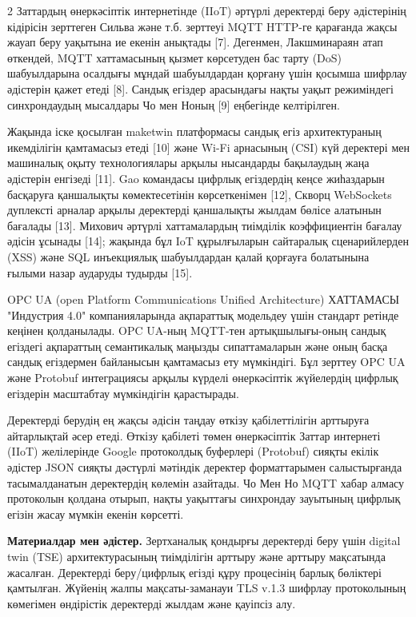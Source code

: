 \begin{multicols}{2}
Заттардың өнеркәсіптік интернетінде (IIoT) әртүрлі деректерді беру
әдістерінің кідірісін зерттеген Сильва және т.б. зерттеуі MQTT HTTP-ге
қарағанда жақсы жауап беру уақытына ие екенін анықтады {[}7{]}.
Дегенмен, Лакшминараян атап өткендей, MQTT хаттамасының қызмет
көрсетуден бас тарту (DoS) шабуылдарына осалдығы мұндай шабуылдардан
қорғану үшін қосымша шифрлау әдістерін қажет етеді {[}8{]}. Сандық
егіздер арасындағы нақты уақыт режиміндегі синхрондаудың мысалдары Чо
мен Ноның {[}9{]} еңбегінде келтірілген.

Жақында іске қосылған maketwin платформасы сандық егіз архитектураның
икемділігін қамтамасыз етеді {[}10{]} және Wi-Fi арнасының (CSI) күй
деректері мен машиналық оқыту технологиялары арқылы нысандарды
бақылаудың жаңа әдістерін енгізеді {[}11{]}. Gao командасы цифрлық
егіздердің кеңсе жиһаздарын басқаруға қаншалықты көмектесетінін
көрсеткенімен {[}12{]}, Скворц WebSockets дуплексті арналар арқылы
деректерді қаншалықты жылдам бөлісе алатынын бағалады {[}13{]}. Михович
әртүрлі хаттамалардың тиімділік коэффициентін бағалау әдісін ұсынады
{[}14{]}; жақында бұл IoT құрылғыларын сайтаралық сценарийлерден (XSS)
және SQL инъекциялық шабуылдардан қалай қорғауға болатынына ғылыми назар
аударуды тудырды {[}15{]}.

OPC UA (open Platform Communications Unified Architecture) ХАТТАМАСЫ
"Индустрия 4.0" компанияларында ақпараттық модельдеу үшін стандарт
ретінде кеңінен қолданылады. OPC UA-ның MQTT-тен артықшылығы-оның сандық
егіздегі ақпараттың семантикалық маңызды сипаттамаларын және оның басқа
сандық егіздермен байланысын қамтамасыз ету мүмкіндігі. Бұл зерттеу OPC
UA және Protobuf интеграциясы арқылы күрделі өнеркәсіптік жүйелердің
цифрлық егіздерін масштабтау мүмкіндігін қарастырады.

Деректерді берудің ең жақсы әдісін таңдау өткізу қабілеттілігін
арттыруға айтарлықтай әсер етеді. Өткізу қабілеті төмен өнеркәсіптік
Заттар интернеті (IIoT) желілерінде Google протоколдық буферлері
(Protobuf) сияқты екілік әдістер JSON сияқты дәстүрлі мәтіндік деректер
форматтарымен салыстырғанда тасымалданатын деректердің көлемін азайтады.
Чо Мен Но MQTT хабар алмасу протоколын қолдана отырып, нақты уақыттағы
синхрондау зауытының цифрлық егізін жасау мүмкін екенін көрсетті.

{\bfseries Материалдар мен әдістер.} Зертханалық қондырғы деректерді беру
үшін digital twin (TSE) архитектурасының тиімділігін арттыру және
арттыру мақсатында жасалған. Деректерді беру/цифрлық егізді құру
процесінің барлық бөліктері қамтылған. Жүйенің жалпы мақсаты-заманауи
TLS v.1.3 шифрлау протоколының көмегімен өндірістік деректерді жылдам
және қауіпсіз алу.


\end{multicols}
